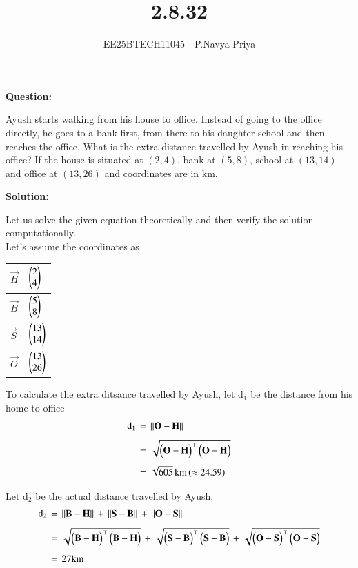 \documentclass[journal,12pt,onecolumn]{IEEEtran}
\theoremstyle{remark}
\begin{document}
\title{2.8.32}
\author{EE25BTECH11045 - P.Navya Priya}
\maketitle
\renewcommand{\thefigure}{\theenumi}
\renewcommand{\thetable}{\theenumi}

\textbf{Question:}

Ayush starts walking from his house to office. Instead of going to the office directly, he goes to a bank first, from there to his daughter school and then reaches the office. What is the extra distance travelled by Ayush in reaching his office? If the house is situated at $(2,4)$, bank at $(5,8)$, school at $(13,14)$ and office at $(13,26)$ and coordinates are in km.

\vspace{0.5cm}
\textbf{Solution:}

Let us solve the given equation theoretically and then verify the solution computationally.\\[5pt]
Let's assume the coordinates as

\begin{table}[H]
\centering
\renewcommand{\arraystretch}{1}
\begin{tabular}{|m{1cm}|m{1cm}|}
\hline
  $\vec{H}$   &  $\begin{pmatrix}2\\4\end{pmatrix}$ \\ \hline 
  $\vec{B}$   &  $\begin{pmatrix}5\\8\end{pmatrix}$ \\ \hline
  $\vec{S}$   &  $\begin{pmatrix}13\\14\end{pmatrix}$ \\ \hline
  $\vec{O}$   &  $\begin{pmatrix}13\\26\end{pmatrix}$ \\ \hline
\end{tabular}
\end{table}

To calculate the extra ditsance travelled by Ayush, let d$_1$ be the distance from his home to office
\begin{align}
    \text{d}_1\,&=\,||\mathbf{O}-\mathbf{H}||\\[4pt]
    \,&=\,\sqrt{\begin{pmatrix}\mathbf{O-H}\end{pmatrix}^\top\begin{pmatrix}\mathbf{O-H}\end{pmatrix}}\\[4pt]
    \,&=\,\sqrt{605}\,\text{km}\left(\approx 24.59\right)
\end{align}

Let d$_2$ be the actual distance travelled by Ayush,
\begin{align}
    \text{d}_2\,&=\,||\mathbf{B}-\mathbf{H}||\,+\,||\mathbf{S}-\mathbf{B}||\,+\,||\mathbf{O}-\mathbf{S}||\\[4pt]
    \,&=\,\sqrt{\begin{pmatrix}\mathbf{B-H}\end{pmatrix}^\top\begin{pmatrix}\mathbf{B-H}\end{pmatrix}}\,+\,\sqrt{\begin{pmatrix}\mathbf{S-B}\end{pmatrix}^\top\begin{pmatrix}\mathbf{S-B}\end{pmatrix}}\,+\,\sqrt{\begin{pmatrix}\mathbf{O-S}\end{pmatrix}^\top\begin{pmatrix}\mathbf{O-S}\end{pmatrix}}\\[4pt]
     \,&=\,27\text{km}
\end{align}
\end{document}
